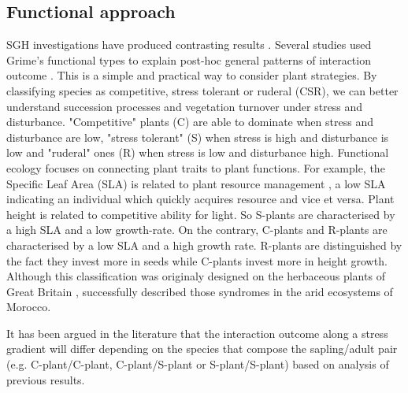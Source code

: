 \documentclass[12pt, a4paper]{article} %
\begin{document}
\subsection{Functional approach}
SGH investigations have produced contrasting results \citep{Maestre2009}. Several studies used Grime's functional types to explain post-hoc general patterns of interaction outcome \citep{Maestre2009,Butterfield2013, Michalet2006}. %
This is a simple and practical way to consider plant strategies. By classifying species as competitive, stress tolerant or ruderal (CSR), we can better understand succession processes \citep{Raevel2012} and vegetation turnover under stress and disturbance. "Competitive" plants (C) are able to dominate when stress and disturbance are low, "stress tolerant" (S) when stress is high and disturbance is low and "ruderal" ones (R) when stress is low and disturbance high.%
Functional ecology focuses on connecting plant traits to plant functions. For example, the Specific Leaf Area (SLA) is related to plant resource management \citep{Grime1976}, a low SLA indicating an individual which quickly acquires resource and vice et versa. Plant height is related to competitive ability for light. So S-plants are characterised by a high SLA and a low growth-rate. On the contrary, C-plants and R-plants are characterised by a low SLA and a high growth rate. R-plants are distinguished by the fact they invest more in seeds while C-plants invest more in height growth. Although this classification was originaly designed on the herbaceous plants of Great Britain \citep{Grime1976}, \citet{frenette-dussault_functional_2012} successfully described those syndromes in the arid ecosystems of Morocco.

It has been argued in the literature that the interaction outcome along a stress gradient will differ depending on the species that compose the sapling/adult pair (e.g. C-plant/C-plant, C-plant/S-plant or S-plant/S-plant) \citep{Maestre2009} based on analysis of previous results.
\end{document}
